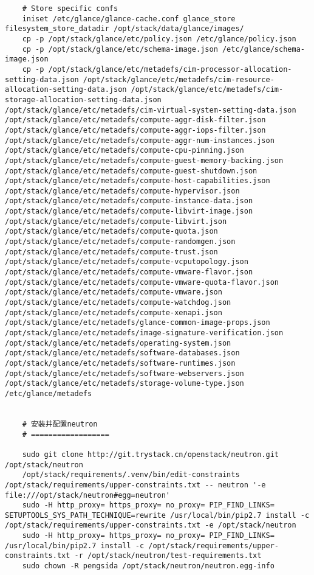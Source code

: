 \documentclass[a4paper,left=1.5cm,right=1.5cm,11pt]{article}
\begin{document}
\begin{lstlisting}
	# Store specific confs
    iniset /etc/glance/glance-cache.conf glance_store filesystem_store_datadir /opt/stack/data/glance/images/
	cp -p /opt/stack/glance/etc/policy.json /etc/glance/policy.json
    cp -p /opt/stack/glance/etc/schema-image.json /etc/glance/schema-image.json
    cp -p /opt/stack/glance/etc/metadefs/cim-processor-allocation-setting-data.json /opt/stack/glance/etc/metadefs/cim-resource-allocation-setting-data.json /opt/stack/glance/etc/metadefs/cim-storage-allocation-setting-data.json /opt/stack/glance/etc/metadefs/cim-virtual-system-setting-data.json /opt/stack/glance/etc/metadefs/compute-aggr-disk-filter.json /opt/stack/glance/etc/metadefs/compute-aggr-iops-filter.json /opt/stack/glance/etc/metadefs/compute-aggr-num-instances.json /opt/stack/glance/etc/metadefs/compute-cpu-pinning.json /opt/stack/glance/etc/metadefs/compute-guest-memory-backing.json /opt/stack/glance/etc/metadefs/compute-guest-shutdown.json /opt/stack/glance/etc/metadefs/compute-host-capabilities.json /opt/stack/glance/etc/metadefs/compute-hypervisor.json /opt/stack/glance/etc/metadefs/compute-instance-data.json /opt/stack/glance/etc/metadefs/compute-libvirt-image.json /opt/stack/glance/etc/metadefs/compute-libvirt.json /opt/stack/glance/etc/metadefs/compute-quota.json /opt/stack/glance/etc/metadefs/compute-randomgen.json /opt/stack/glance/etc/metadefs/compute-trust.json /opt/stack/glance/etc/metadefs/compute-vcputopology.json /opt/stack/glance/etc/metadefs/compute-vmware-flavor.json /opt/stack/glance/etc/metadefs/compute-vmware-quota-flavor.json /opt/stack/glance/etc/metadefs/compute-vmware.json /opt/stack/glance/etc/metadefs/compute-watchdog.json /opt/stack/glance/etc/metadefs/compute-xenapi.json /opt/stack/glance/etc/metadefs/glance-common-image-props.json /opt/stack/glance/etc/metadefs/image-signature-verification.json /opt/stack/glance/etc/metadefs/operating-system.json /opt/stack/glance/etc/metadefs/software-databases.json /opt/stack/glance/etc/metadefs/software-runtimes.json /opt/stack/glance/etc/metadefs/software-webservers.json /opt/stack/glance/etc/metadefs/storage-volume-type.json /etc/glance/metadefs


	# 安装并配置neutron
	# ==================

	sudo git clone http://git.trystack.cn/openstack/neutron.git /opt/stack/neutron
	/opt/stack/requirements/.venv/bin/edit-constraints /opt/stack/requirements/upper-constraints.txt -- neutron '-e file:///opt/stack/neutron#egg=neutron'
	sudo -H http_proxy= https_proxy= no_proxy= PIP_FIND_LINKS= SETUPTOOLS_SYS_PATH_TECHNIQUE=rewrite /usr/local/bin/pip2.7 install -c /opt/stack/requirements/upper-constraints.txt -e /opt/stack/neutron
	sudo -H http_proxy= https_proxy= no_proxy= PIP_FIND_LINKS= /usr/local/bin/pip2.7 install -c /opt/stack/requirements/upper-constraints.txt -r /opt/stack/neutron/test-requirements.txt
	sudo chown -R pengsida /opt/stack/neutron/neutron.egg-info


\end{lstlisting}
\end{document}
